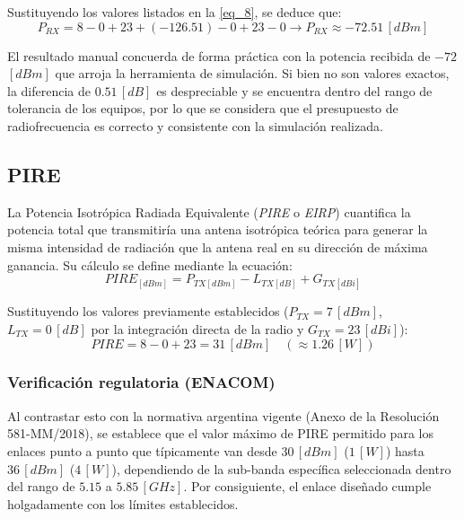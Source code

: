 Sustituyendo los valores listados en la \autoref{eq_8}, se deduce que:
\begin{equation}
    P_{RX} = 8 - 0 + 23 + (-126.51) - 0 + 23 - 0 \longrightarrow P_{RX} \approx -72.51 \, [dBm]
\end{equation}
     
El resultado manual concuerda de forma práctica con la potencia recibida de $-72 \,$ $[dBm]$ que arroja la herramienta de simulación. Si bien no son valores exactos, la diferencia de $0.51 \, [dB]$ es despreciable y se encuentra dentro del rango de tolerancia de los equipos, por lo que se considera que el presupuesto de radiofrecuencia es correcto y consistente con la simulación realizada.



\subsection{PIRE}
\label{sec_2.12}
La Potencia Isotrópica Radiada Equivalente (\textit{PIRE} o \textit{EIRP}) cuantifica la potencia total que transmitiría una antena isotrópica teórica para generar la misma intensidad de radiación que la antena real en su dirección de máxima ganancia. Su cálculo se define mediante la ecuación:
\begin{equation}
    PIRE_{[dBm]} = P_{TX[dBm]} - L_{TX[dB]} + G_{TX[dBi]}
    \label{eq_9}
\end{equation}

Sustituyendo los valores previamente establecidos ($P_{TX} = 7 \, [dBm]$, $L_{TX} = 0 \, [dB]$ por la integración directa de la radio y $G_{TX} = 23 \, [dBi]$):
\begin{equation}
    PIRE = 8 - 0 + 23 = 31 \, [dBm] \quad (\approx 1.26 \, [W])
    \label{eq_10}
\end{equation}


\subsubsection{Verificación regulatoria (ENACOM)}
\label{sec_2.12.1}
Al contrastar esto con la normativa argentina vigente (Anexo de la Resolución 581-MM/2018), se establece que el valor máximo de PIRE permitido para los enlaces punto a punto que típicamente van desde $30 \, [dBm]$ ($1 \, [W]$) hasta $36 \, [dBm]$ ($4 \, [W]$), dependiendo de la sub-banda específica seleccionada dentro del rango de $5.15$ a $5.85 \, [GHz]$. Por consiguiente, el enlace diseñado cumple holgadamente con los límites establecidos.

